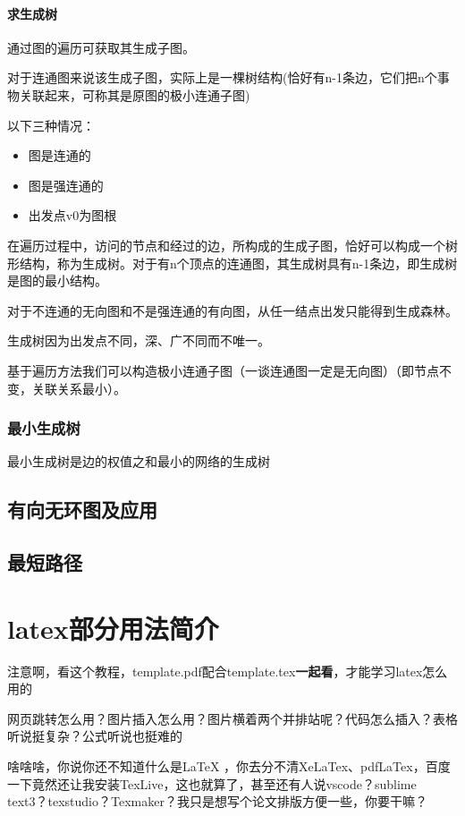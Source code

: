 \documentclass[AutoFakeBold]{LZUThesis2007}
\begin{document}
			\subsubsection{求生成树}
通过图的遍历可获取其生成子图。

对于连通图来说该生成子图，实际上是一棵树结构(恰好有n-1条边，它们把n个事物关联起来，可称其是原图的极小连通子图)

以下三种情况：
\begin{itemize}
	\item 图是连通的
	\item 图是强连通的
	\item 出发点v0为图根
\end{itemize}
在遍历过程中，访问的节点和经过的边，所构成的生成子图，恰好可以构成一个树形结构，称为生成树。对于有n个顶点的连通图，其生成树具有n-1条边，即生成树是图的最小结构。

对于不连通的无向图和不是强连通的有向图，从任一结点出发只能得到生成森林。

生成树因为出发点不同，深、广不同而不唯一。

基于遍历方法我们可以构造极小连通子图（一谈连通图一定是无向图）（即节点不变，关联关系最小）。

			\subsection{最小生成树}
最小生成树是边的权值之和最小的网络的生成树
	\section{有向无环图及应用}
	\section{最短路径}



\chapter{latex部分用法简介}

注意啊，看这个教程，template.pdf配合template.tex\textbf{一起看}，才能学习latex怎么用的

网页跳转怎么用？图片插入怎么用？图片横着两个并排站呢？代码怎么插入？表格听说挺复杂？公式听说也挺难的

啥啥啥，你说你还不知道什么是LaTeX ，你去分不清XeLaTex、pdfLaTex，百度一下竟然还让我安装TexLive，这也就算了，甚至还有人说vscode？sublime text3？texstudio？Texmaker？我只是想写个论文排版方便一些，你要干嘛？
\end{document}

